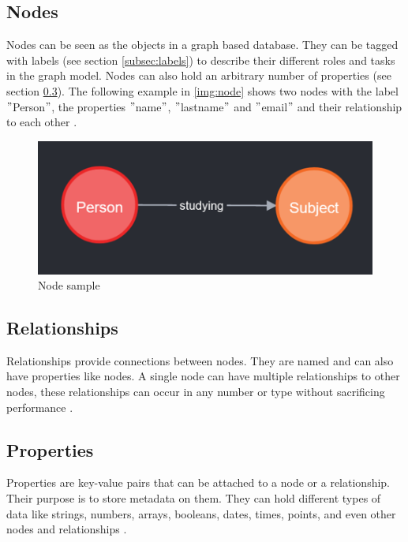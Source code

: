 \subsection{Nodes}
Nodes can be seen as the objects in a graph based database.
They can be tagged with labels (see section \ref{subsec:labels}) to describe their different roles and tasks in the graph model.
Nodes can also hold an arbitrary number of properties (see section \ref{subsec:properties}).
The following example in \autoref{img:node} shows two nodes with the label \("\)Person\("\), the properties \("\)name\("\), \("\)lastname\("\)
and \("\)email\("\) and their relationship to each other \parencite[compare P. 6f.]{PractivalNeo4j}.
\begin{figure}[!h]
    \centering
    \includegraphics[width=1 \linewidth]{images/nodes.png}
    \caption{Node sample} \label{img:node}
\end{figure}
\subsection{Relationships}\label{subsec:relationships}
Relationships provide connections between nodes.
They are named and can also have properties like nodes.
A single node can have multiple relationships to other nodes, these relationships can occur in any number or type without
sacrificing performance \parencite[compare]{neo4j:allgemeins}.

\subsection{Properties} \label{subsec:properties}
Properties are key-value pairs that can be attached to a node or a relationship.
Their purpose is to store metadata on them.
They can hold different types of data like strings, numbers, arrays, booleans, dates, times, points, and even other nodes and relationships \parencite[compare]{neo4j:Values} \parencite[compare]{neo4j:Graph}.

